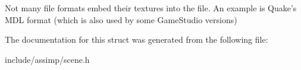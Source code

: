 \-Not many file formats embed their textures into the file. \-An example is \-Quake's \-M\-D\-L format (which is also used by some \-Game\-Studio versions) 

\-The documentation for this struct was generated from the following file\-:\begin{DoxyCompactItemize}
\item 
include/assimp/scene.\-h\end{DoxyCompactItemize}
